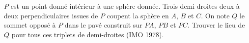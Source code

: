 $P$ est un point donné intérieur à une sphère donnée. Trois demi-droites deux à deux perpendiculaires issues de $P$ coupent la sphère en $A$, $B$ et $C$. On note $Q$ le sommet opposé à $P$ dans le pavé construit sur $PA$, $PB$ et $PC$. Trouver le lieu de $Q$ pour tous ces triplets de demi-droites (IMO 1978).
